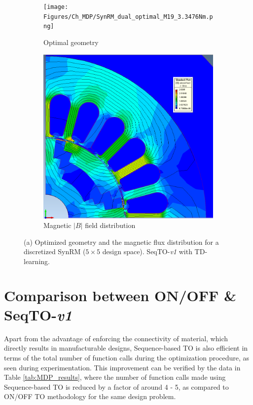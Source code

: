 \begin{figure}[h!]
\centering
\begin{subfigure}{.5\textwidth}
  \centering
  \texttt{[image: Figures/Ch\_MDP/SynRM\_dual\_optimal\_M19\_3.3476Nm.png]}
  \caption{Optimal geometry}
  \label{fig:MDP_SynRM_geometry_TD}
\end{subfigure}%
\begin{subfigure}{.5\textwidth}
  \centering
  \includegraphics[width=\linewidth]{Figures/Ch_MDP/B_field_M19_IGTE2020.PNG}
  \caption{Magnetic $\left|B\right|$ field distribution}
  \label{fig:MDP_SynRM_Bfields_TD}
\end{subfigure}
\caption{(a) Optimized geometry and the magnetic flux distribution for a discretized SynRM ($5 \times 5$ design space). SeqTO-\textit{v1} with TD-learning.}
\label{fig:MDP_SynRM_GA_result}
\end{figure}

\section{Comparison between ON/OFF \& SeqTO-\textit{v1}}
\label{section:MDP_comparison_OnOFF_SeqTO}

Apart from the advantage of enforcing the connectivity of material, which directly results in manufacturable designs, Sequence-based TO is also efficient in terms of the total number of function calls during the optimization procedure, as seen during experimentation. This improvement can be verified by the data in Table \ref{tab:MDP_results}, where the number of function calls made using Sequence-based TO is reduced by a factor of around 4 - 5, as compared to ON/OFF TO methodology for the same design problem.

